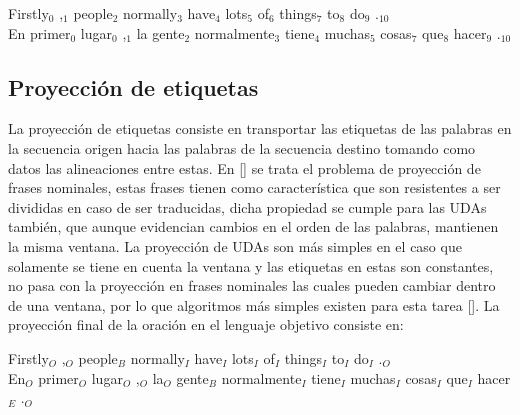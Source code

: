 \begin{adjustwidth}{25pt}{25pt}
	Firstly$_0$ ,$_1$ people$_2$ normally$_3$ have$_4$ lots$_5$ of$_6$ things$_7$ to$_8$ do$_9$ .$_{10}$ \\
	En primer$_0$ lugar$_0$ ,$_1$ la gente$_2$ normalmente$_3$ tiene$_4$ muchas$_5$ cosas$_7$ que$_8$ hacer$_9$ .$_{10}$
\end{adjustwidth}

\subsection{Proyección de etiquetas}

La proyección de etiquetas consiste en transportar las etiquetas de las palabras en la secuencia origen
hacia las palabras de la secuencia destino tomando como datos las alineaciones entre estas. En [\cite{yarowsky2001inducing}]
se trata el problema de proyección de frases nominales, estas frases tienen como característica que son resistentes
a ser divididas en caso de ser traducidas, dicha propiedad se cumple para las UDAs también, que aunque evidencian 
cambios en el orden de las palabras, mantienen la misma ventana. La proyección de UDAs son más simples en el caso
que solamente se tiene en cuenta la ventana y las etiquetas en estas son constantes, no pasa con la proyección en
frases nominales las cuales pueden cambiar dentro de una ventana, por lo que algoritmos más simples existen
para esta tarea [\cite{eger2018cross}]. La proyección final de la oración en el lenguaje objetivo consiste en:

\begin{adjustwidth}{25pt}{25pt}
	Firstly$_O$ ,$_O$ people$_B$ normally$_I$ have$_I$ lots$_I$ of$_I$ things$_I$ to$_I$ do$_I$ .$_O$ \\
	En$_O$ primer$_O$ lugar$_O$ ,$_O$ la$_O$ gente$_B$ normalmente$_I$ tiene$_I$ muchas$_I$ cosas$_I$ que$_I$ hacer$_E$ .$_O$
\end{adjustwidth}
